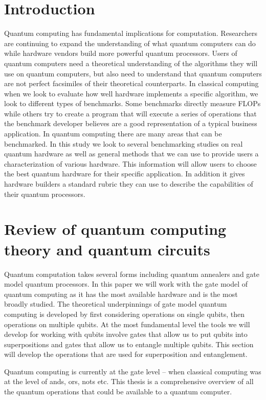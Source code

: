 \documentclass{article}
\begin{document}
\section{Introduction}
Quantum computing has fundamental implications for computation. Researchers are continuing to expand the understanding of what quantum computers can do while hardware vendors build more powerful quantum processors. Users of quantum computers need a theoretical understanding of the algorithms they will use on quantum computers, but also need to understand that quantum computers are not perfect facsimiles of their theoretical counterparts. 
In classical computing when we look to evaluate how well hardware implements a specific algorithm, we look to different types of benchmarks. Some benchmarks directly measure FLOPs while others try to create a program that will execute a series of operations that the benchmark developer believes are a good representation of a typical business application. In quantum computing there are many areas that can be benchmarked. In this study we look to several benchmarking studies on real quantum hardware as well as general methods that we can use to provide users a characterization of various hardware. This information will allow users to choose the best quantum hardware for their specific application. In addition it gives hardware builders a standard rubric they can use to describe the capabilities of their quantum processors.


\section{Review of quantum computing theory and quantum circuits}
Quantum computation takes several forms including quantum annealers and gate model quantum processors. In this paper we will work with the gate model of quantum computing as it has the most available hardware and is the most broadly studied. The theoretical underpinnings of gate model quantum computing is developed by first considering operations on single qubits, then operations on multiple qubits. At the most fundamental level the tools we will develop for working with qubits involve gates that allow us to put qubits into superpositions and gates that allow us to entangle multiple qubits. This section will develop the operations that are used for superposition and entanglement. 


Quantum computing is currently at the gate level -- when classical computing was at the level of ands, ors, nots etc. This thesis is a comprehensive overview of all the quantum operations that could be available to a quantum computer.
\end{document}

